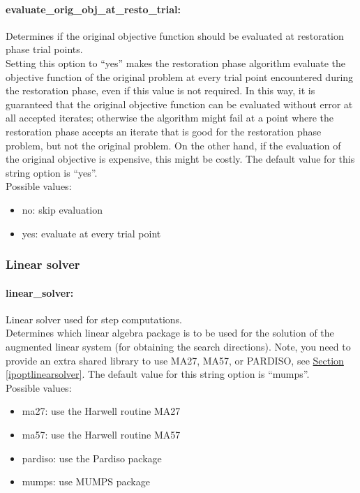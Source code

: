 \paragraph{evaluate\_orig\_obj\_at\_resto\_trial:} Determines if the original objective function should be evaluated at restoration phase trial points. $\;$ \\
 Setting this option to ``yes'' makes the
restoration phase algorithm evaluate the
objective function of the original problem at
every trial point encountered during the
restoration phase, even if this value is not
required.  In this way, it is guaranteed that the
original objective function can be evaluated
without error at all accepted iterates; otherwise
the algorithm might fail at a point where the
restoration phase accepts an iterate that is good
for the restoration phase problem, but not the
original problem.  On the other hand, if the
evaluation of the original objective is
expensive, this might be costly.
The default value for this string option is ``yes''.
\\ 
Possible values:
\begin{itemize}
   \item no: skip evaluation
   \item yes: evaluate at every trial point
\end{itemize}

\subsubsection{Linear solver}

\paragraph{linear\_solver:} Linear solver used for step computations. $\;$ \\
 Determines which linear algebra package is to be used for the solution of the augmented linear system (for obtaining the search directions).
Note, you need to provide an extra shared library to use MA27, MA57, or PARDISO, see \hyperlink{ipoptlinearsolver}{Section \ref{ipoptlinearsolver}}.
The default value for this string option is ``mumps''.
\\
Possible values:
\begin{itemize}
   \item ma27: use the Harwell routine MA27
   \item ma57: use the Harwell routine MA57
   \item pardiso: use the Pardiso package
   \item mumps: use MUMPS package
\end{itemize}

